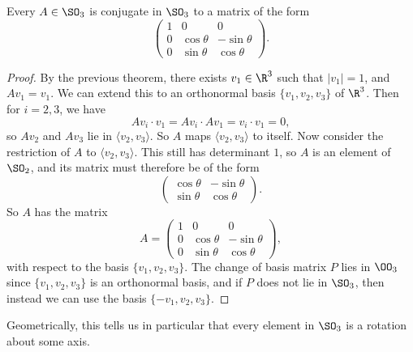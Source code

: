 \begin{corollary}
	Every $A \in \SO_3$ is conjugate in $\SO_3$ to a matrix of the form
	$$
	\begin{pmatrix}
		1 & 0 & 0 \\
		0 & \cos \theta & - \sin \theta \\
		0 & \sin \theta & \cos \theta
	\end{pmatrix}.
	$$
\end{corollary}
\begin{proof}
	By the previous theorem, there exists $v_1 \in \R^3$ such that $|v_1| = 1$, and $Av_1 = v_1$. We can extend this to an orthonormal basis $\{v_1, v_2, v_3\}$ of $\R^3$. Then for $i = 2, 3$, we have 
	$$
Av_i \cdot v_1 = A v_i \cdot Av_1 = v_i \cdot v_1 = 0,
	$$
	so $Av_2$ and $Av_3$ lie in $\langle v_2, v_3 \rangle$. So $A$ maps $\langle v_2, v_3 \rangle$ to itself. Now consider the restriction of $A$ to $\langle v_2, v_3 \rangle$. This still has determinant $1$, so $A$ is an element of $\SO_2$, and its matrix must therefore be of the form
	$$
	\begin{pmatrix}
		\cos \theta & - \sin \theta \\
		\sin \theta & \cos \theta
	\end{pmatrix}.
	$$
	So $A$ has the matrix
	$$
A = \begin{pmatrix}
	1 & 0 & 0 \\
	0 & \cos \theta & - \sin \theta \\
	0 & \sin \theta & \cos \theta
\end{pmatrix},
	$$
	with respect to the basis $\{v_1, v_2, v_3\}$. The change of basis matrix $P$ lies in $\OO_3$ since $\{v_1, v_2, v_3\}$ is an orthonormal basis, and if $P$ does not lie in $\SO_3$, then instead we can use the basis $\{-v_1, v_2, v_3\}$.
\end{proof}

Geometrically, this tells us in particular that every element in $\SO_3$ is a rotation about some axis. 

